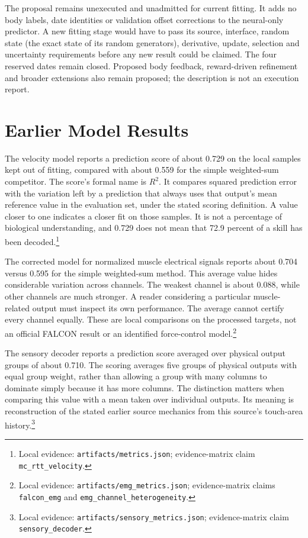 The proposal remains unexecuted and unadmitted for current fitting. It adds no
body labels, date identities or validation offset corrections to the neural-only
predictor. A new fitting stage would have to pass its source, interface, random
state (the exact state of its random generators), derivative, update, selection and uncertainty requirements before any
new result could be claimed. The four reserved dates remain closed. Proposed
body feedback, reward-driven refinement and broader extensions also remain
proposed; the description is not an execution report.


\section{Earlier Model Results}

The velocity model reports a prediction score of about 0.729 on the local samples kept out of fitting, compared with about 0.559 for the simple weighted-sum competitor. The score's formal name is $R^2$. It compares squared prediction error with the variation left by a prediction that always uses that output's mean reference value in the evaluation set, under the stated scoring definition. A value closer to one indicates a closer fit on those samples. It is not a percentage of biological understanding, and 0.729 does not mean that 72.9 percent of a skill has been decoded.\footnote{Local evidence: \texttt{artifacts/metrics.json}; evidence-matrix claim \texttt{mc\_rtt\_velocity}.}

The corrected model for normalized muscle electrical signals reports about 0.704 versus 0.595 for the simple weighted-sum method. This average value hides considerable variation across channels. The weakest channel is about 0.088, while other channels are much stronger. A reader considering a particular muscle-related output must inspect its own performance. The average cannot certify every channel equally. These are local comparisons on the processed targets, not an official FALCON result or an identified force-control model.\footnote{Local evidence: \texttt{artifacts/emg\_metrics.json}; evidence-matrix claims \texttt{falcon\_emg} and \texttt{emg\_channel\_heterogeneity}.}

The sensory decoder reports a prediction score averaged over physical output groups of about 0.710. The scoring averages five groups of physical outputs with equal group weight, rather than allowing a group with many columns to dominate simply because it has more columns. The distinction matters when comparing this value with a mean taken over individual outputs. Its meaning is reconstruction of the stated earlier source mechanics from this source's touch-area history.\footnote{Local evidence: \texttt{artifacts/sensory\_metrics.json}; evidence-matrix claim \texttt{sensory\_decoder}.}

